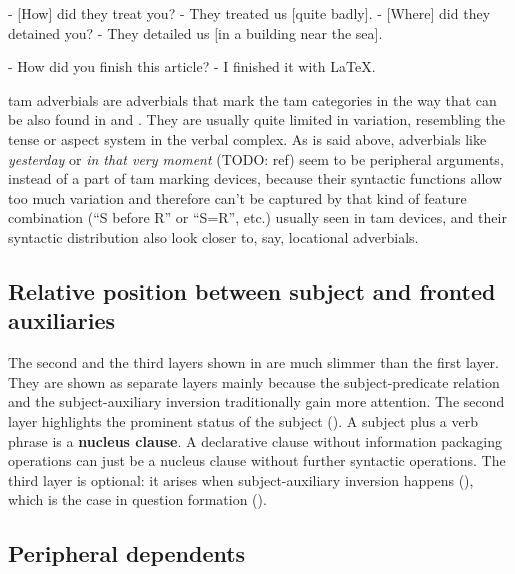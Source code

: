 \documentclass[UTF8, a4paper, oneside, scheme=plain, 12pt]{ctexbook}
\newcommand*{\concept}[1]{\textbf{#1}}
\newcommand{\form}[1]{\emph{#1}}
\begin{document}
\begin{exe}
    \ex\label{ex:simple-clause.dependents.ex-1} - [How] did they treat you? - They treated us [quite badly].
    \ex\label{ex:simple-clause.dependents.ex-2} - [Where] did they detained you? - They detailed us [in a building near the sea].
\end{exe}

\begin{exe}
    \ex\label{ex:simple-clause.dependents.ex-3} - How did you finish this article? 
    - I finished it with LaTeX.
\end{exe}

\acs{tam} adverbials are adverbials that mark the \acs{tam} categories 
in the way that can be also found in 
and .
They are usually quite limited in variation,
resembling the tense or aspect system in the verbal complex.
As is said above, adverbials like \form{yesterday} or \form{in that very moment} (TODO: ref)
seem to be peripheral arguments, instead of a part of \acs{tam} marking devices,
because their syntactic functions allow too much variation 
and therefore can't be captured by that kind of feature combination 
(``S before R'' or ``S=R'', etc.)
usually seen in \acs{tam} devices,
and their syntactic distribution also look closer to, say, locational adverbials. 

\subsection{Relative position between subject and fronted auxiliaries}

The second and the third layers shown in 
are much slimmer than the first layer.
They are shown as separate layers mainly because 
the subject-predicate relation 
and the subject-auxiliary inversion 
traditionally gain more attention.
The second layer highlights the prominent status of the subject ().
A subject plus a verb phrase is a \concept{nucleus clause}.
A declarative clause without information packaging operations
can just be a nucleus clause without further syntactic operations.
The third layer is optional:
it arises when subject-auxiliary inversion happens (),
which is the case in %
question formation ().

\subsection{Peripheral dependents}
\end{document}
